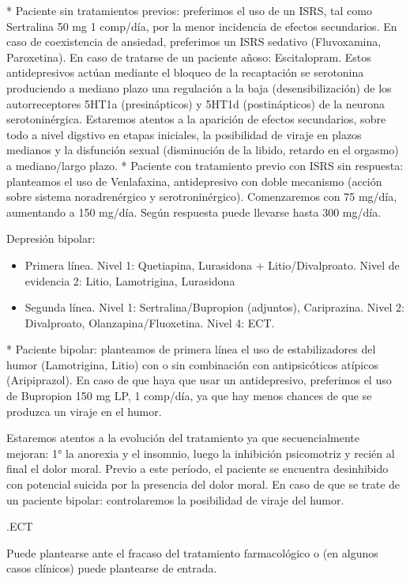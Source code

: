 * Paciente sin tratamientos previos: preferimos el uso de un ISRS, tal como Sertralina 50 mg 1 comp/día, por la menor incidencia de efectos secundarios. En caso de coexistencia de ansiedad, preferimos un ISRS sedativo (Fluvoxamina, Paroxetina). En caso de tratarse de un paciente añoso: Escitalopram. Estos antidepresivos actúan mediante el bloqueo de la recaptación se serotonina produciendo a mediano plazo una regulación a la baja (desensibilización) de los autorreceptores 5HT1a (presinápticos) y 5HT1d (postinápticos) de la neurona serotoninérgica. Estaremos atentos a la aparición de efectos secundarios, sobre todo a nivel digstivo en etapas iniciales, la posibilidad de viraje en plazos medianos y la disfunción sexual (disminución de la libido, retardo en el orgasmo) a mediano/largo plazo.
* Paciente con tratamiento previo con ISRS sin respuesta: planteamos el uso de Venlafaxina, antidepresivo con doble mecanismo (acción sobre sistema noradrenérgico y serotroninérgico). Comenzaremos con 75 mg/día, aumentando a 150 mg/día. Según respuesta puede llevarse hasta 300 mg/día.

Depresión bipolar:
\begin{itemize}
	\item Primera línea. Nivel 1: Quetiapina, Lurasidona + Litio/Divalproato. Nivel de evidencia 2: Litio, Lamotrigina, Lurasidona
	\item Segunda línea. Nivel 1: Sertralina/Bupropion (adjuntos), Cariprazina. Nivel 2: Divalproato, Olanzapina/Fluoxetina. Nivel 4: ECT. 
\end{itemize}
* Paciente bipolar: planteamos de primera línea el uso de estabilizadores del humor (Lamotrigina, Litio) con o sin combinación con antipsicóticos atípicos (Aripiprazol). En caso de que haya que usar un antidepresivo, preferimos el uso de Bupropion 150 mg LP, 1 comp/día, ya que hay menos chances de que se produzca un viraje en el humor.

Estaremos atentos a la evolución del tratamiento ya que secuencialmente mejoran: 1° la anorexia y el insomnio, luego la inhibición psicomotriz y recién al final el dolor moral. Previo a este período, el paciente se encuentra desinhibido con potencial suicida por la presencia del dolor moral. En caso de que se trate de un paciente bipolar: controlaremos la posibilidad de viraje del humor.

.ECT

Puede plantearse ante el fracaso del tratamiento farmacológico o (en algunos casos clínicos) puede plantearse de entrada.

